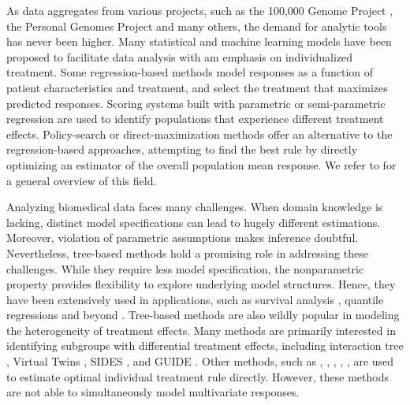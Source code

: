 \documentclass[smallextended]{svjour3}
\begin{document}
As data aggregates from various projects, such as the 100,000 Genome Project \citep{Peplowi1757}, the Personal Genomes Project \citep{ball2014harvard} and many others, the demand for analytic tools has never been higher. Many statistical and machine learning models have been proposed to facilitate data analysis with am emphasis on individualized treatment. Some regression-based methods \citep{Brinkley2010,qian2011performance} model responses as a function of patient characteristics and treatment, and select the treatment that maximizes predicted responses. Scoring systems built with parametric or semi-parametric regression\citep{Cai2011, Zhao2013} are used to identify populations that experience different treatment effects. Policy-search or direct-maximization methods \citep{Zhang2012,zhang2012robust, Zhao2012, Zhang2013} offer an alternative to the regression-based approaches, attempting to find the best rule by directly optimizing an estimator of the overall population mean response. We refer to \cite{kosorok2015adaptive} for a general overview of this field. 

Analyzing biomedical data faces many challenges. When domain knowledge is lacking, distinct model specifications can lead to hugely different estimations. Moreover, violation of parametric assumptions makes inference doubtful. Nevertheless, tree-based methods hold a promising role in addressing these challenges. While they require less model specification, the nonparametric property provides flexibility to explore underlying model structures. Hence, they have been extensively used in applications, such as survival analysis \citep{gordon1985tree, leblanc1992relative, hothorn2005survival, ishwaran2008random, zhu2012recursively}, quantile regressions \citep{meinshausen2006quantile} and beyond \citep{athey2019generalized}. Tree-based methods are also wildly popular in modeling the heterogeneity of treatment effects. Many methods are primarily interested in identifying subgroups with differential treatment effects, including interaction tree \citep{Su2009}, Virtual Twins \citep{Foster2011a}, SIDES \citep{Lipkovich2011}, and GUIDE \citep{Loh2015}. Other methods, such as \cite{Zhang2012}, \cite{Laber2015a}, \cite{Zhang2015a}, \cite{athey2016recursive}, \cite{Zhu2017}, are used to estimate optimal individual treatment rule directly. However, these methods are not able to simultaneously model multivariate responses.
\end{document}
